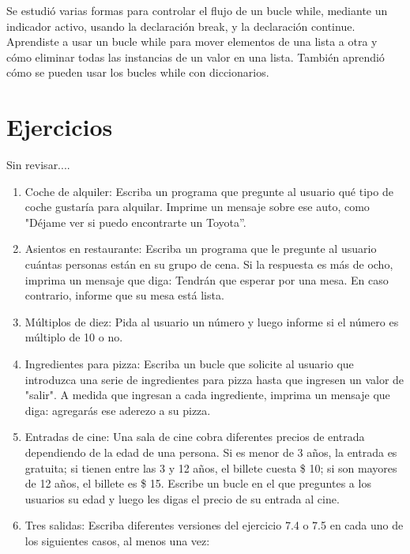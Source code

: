 	Se estudió  varias formas para controlar el  flujo de un bucle  {\ttfamily while}, mediante un indicador activo, usando la declaración  {\ttfamily break}, y  la declaración {\ttfamily continue}. Aprendiste a usar un bucle  {\ttfamily while} para mover  elementos de una lista a otra y cómo eliminar todas las instancias de un valor en una lista. También aprendió cómo se pueden usar los bucles  {\ttfamily while} con diccionarios.
	
	
	
	\section{Ejercicios}
	
	
	Sin revisar....
	
	\begin{enumerate}[3.5.1]
		
		\item  Coche de alquiler: Escriba un programa que pregunte al usuario qué tipo de coche gustaría para alquilar.
		Imprime un mensaje sobre ese auto, como "Déjame ver si puedo encontrarte un Toyota”.
		
		\item Asientos en restaurante: Escriba un programa que le pregunte al usuario cuántas personas
		están en su grupo de cena. Si la respuesta es más de ocho, imprima un mensaje que diga:
		Tendrán que esperar por una mesa. En caso contrario, informe que su mesa está lista.
		
		\item  Múltiplos de diez: Pida al usuario un número y luego informe si el número es múltiplo de 10 o no.
		
		\item Ingredientes para pizza: Escriba un bucle que solicite al usuario que introduzca una serie de
		ingredientes para pizza hasta que ingresen un valor de "salir". A medida que ingresan a cada ingrediente, imprima
		un mensaje que diga: agregarás ese aderezo a su pizza.
		
		\item Entradas de cine: Una sala de cine cobra diferentes precios de entrada dependiendo de
		la edad de una persona. Si es menor de 3 años, la entrada es gratuita; si tienen entre las 3 y  12 años, el billete cuesta \$ 10;  si son mayores de 12 años, el billete es  {\scriptsize\$} 15. Escribe un bucle en el que preguntes a los usuarios su edad y luego les digas el precio de su entrada al cine.
		
		\item Tres salidas: Escriba diferentes versiones del ejercicio 7.4 o 7.5 en cada uno de los siguientes casos, al menos una vez:
		

\end{enumerate}

